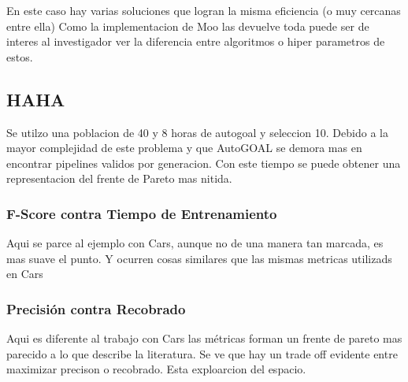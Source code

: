En este caso hay varias soluciones que logran la misma eficiencia (o muy cercanas entre ella) Como la implementacion de Moo las devuelve toda puede ser de interes al investigador ver la diferencia entre algoritmos o hiper parametros de estos.

\subsection{HAHA}

Se utilzo una poblacion de 40 y 8 horas de autogoal y seleccion 10. Debido a la mayor complejidad de este problema y que AutoGOAL se demora mas en encontrar pipelines validos por generacion. Con este tiempo se puede obtener una representacion del frente de Pareto mas nitida.

\subsubsection{F-Score contra Tiempo de Entrenamiento}

Aqui se parce al ejemplo con Cars, aunque no de una manera tan marcada, es mas suave el punto. Y ocurren cosas similares que las mismas metricas utilizads en Cars

\subsubsection{Precisi\'on contra Recobrado}

Aqui es diferente al trabajo con Cars las m\'etricas forman un frente de pareto mas parecido a lo que describe la literatura. Se ve que hay un trade off evidente entre maximizar precison o recobrado. Esta exploarcion del espacio.






